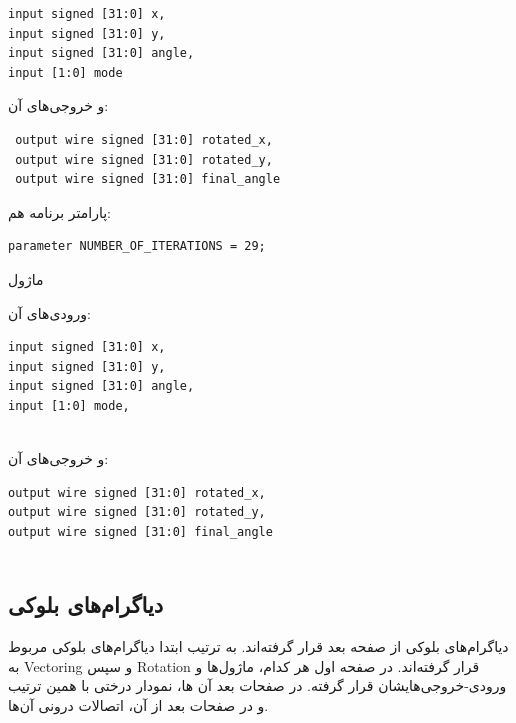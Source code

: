 \documentclass[12pt,titlepage,a4page , tikz , multi,table , svgnames,xcdraw]{article}
\begin{document}
\begin{latin}
\begin{verbatim}
input signed [31:0] x,
input signed [31:0] y,
input signed [31:0] angle,
input [1:0] mode
\end{verbatim}
\end{latin}

و خروجی‌های آن:

\begin{latin}
\begin{verbatim}
 output wire signed [31:0] rotated_x,
 output wire signed [31:0] rotated_y,
 output wire signed [31:0] final_angle
\end{verbatim}
\end{latin}


پارامتر برنامه هم:

\begin{latin}
\begin{verbatim}
parameter NUMBER_OF_ITERATIONS = 29;
\end{verbatim}
\end{latin}


\hrulefill

ماژول 

ورودی‌های آن:

\begin{latin}

\begin{verbatim}
input signed [31:0] x,
input signed [31:0] y,
input signed [31:0] angle,
input [1:0] mode,
   
\end{verbatim}

\end{latin}


و خروجی‌های آن:


\begin{latin}

\begin{verbatim}
output wire signed [31:0] rotated_x,
output wire signed [31:0] rotated_y,
output wire signed [31:0] final_angle
   
\end{verbatim}
\end{latin}

\newpage

\subsection{دیاگرام‌های بلوکی}


دیاگرام‌های بلوکی از صفحه بعد قرار گرفته‌اند. به ترتیب ابتدا دیاگرام‌های بلوکی مربوط به Vectoring و سپس Rotation قرار گرفته‌اند. در صفحه اول هر کدام، ماژول‌ها و ورودی-خروجی‌هایشان قرار گرفته. در صفحات بعد آن ها،‌ نمودار درختی با همین ترتیب و در صفحات بعد از آن، اتصالات درونی آن‌ها.
\end{document}
